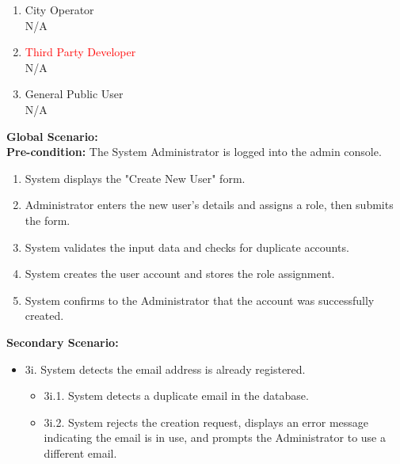 {\begin{enumerate}[{\bf BE1.}]
\begin{enumerate}[{\bf VP1.}]
            {\bf Secondary Scenario:}
            \begin{itemize}
                \item[] {4i.} System detects the email address is already registered.
                \begin{itemize}
                    \item[] {4i.1.} System detects a duplicate email in the database.
                    \item[] {4i.2.} System rejects the creation request, displays an error message indicating the email is in use, and prompts the Administrator to use a different email or edit the existing user.
                \end{itemize}
            \end{itemize}
        \item City Operator \\ N/A
        \item \textcolor{red}{Third Party Developer} \\ N/A
        \item General Public User \\ N/A
    \end{enumerate}
    {\bf Global Scenario:} \\
    {\bf Pre-condition:} The System Administrator is logged into the admin console.
        \begin{enumerate}[1. ]
            \item System displays the "Create New User" form.
            \item Administrator enters the new user's details and assigns a role, then submits the form.
            \item System validates the input data and checks for duplicate accounts.
            \item System creates the user account and stores the role assignment.
            \item System confirms to the Administrator that the account was successfully created.
        \end{enumerate}

    {\bf Secondary Scenario:}
        \begin{itemize}
            \item[] {3i.} System detects the email address is already registered.
            \begin{itemize}
                \item[] {3i.1.} System detects a duplicate email in the database.
                \item[] {3i.2.} System rejects the creation request, displays an error message indicating the email is in use, and prompts the Administrator to use a different email.
            \end{itemize}
        \end{itemize}

\end{enumerate}
}
